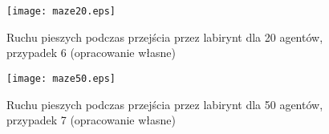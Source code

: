 \begin{figure}
\label{figure:siatka}
\centering
\texttt{[image: maze20.eps]}
\caption{Ruchu pieszych podczas przejścia przez labirynt dla 20 agentów, przypadek 6 (opracowanie własne)}
\end{figure}


\begin{figure}
\label{figure:siatka}
\centering
\texttt{[image: maze50.eps]}
\caption{Ruchu pieszych podczas przejścia przez labirynt dla 50 agentów, przypadek 7 (opracowanie własne)}
\end{figure}

